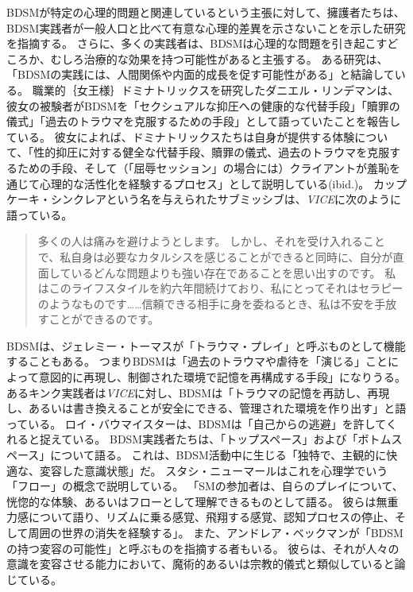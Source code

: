 \documentclass[paper=a4,book,openany]{jlreq}
\begin{document}
BDSMが特定の心理的問題と関連しているという主張に対して、擁護者たちは、BDSM実践者が一般人口と比べて有意な心理的差異を示さないことを示した研究を指摘する\citep{hebert14:_examin_person_charac_assoc_bdsm_orien,powls12:_descr_review_resear_relat_sadom}。
さらに、多くの実践者は、BDSMは心理的な問題を引き起こすどころか、むしろ治療的な効果を持つ可能性があると主張する。
ある研究は、「BDSMの実践には、人間関係や内面的成長を促す可能性がある」と結論している\citep[pp.157-158]{weille02:_psych_consen_sadom_domin_submis_sexual_games}。
職業的｛女王様｝{ドミナトリックス}を研究したダニエル・リンデマンは、彼女の被験者がBDSMを「セクシュアルな抑圧への健康的な代替手段」「贖罪の儀式」「過去のトラウマを克服するための手段」として語っていたことを報告している\citep[p.157]{lindemann11:_bdsm_therap}。
彼女によれば、ドミナトリックスたちは自身が提供する体験について、「性的抑圧に対する健全な代替手段、贖罪の儀式、過去のトラウマを克服するための手段、そして（「屈辱セッション」の場合には）クライアントが羞恥を通じて心理的な活性化を経験するプロセス」として説明している(ibid.)。
カップケーキ・シンクレアという名を与えられたサブミッシブは、\emph{VICE}に次のように語っている。

\begin{quote}
多くの人は痛みを避けようとします。
しかし、それを受け入れることで、私自身は必要なカタルシスを感じることができると同時に、自分が直面しているどんな問題よりも強い存在であることを思い出すのです。
私はこのライフスタイルを約六年間続けており、私にとってそれはセラピーのようなものです……信頼できる相手に身を委ねるとき、私は不安を手放すことができるのです。
\citep{barrett-ibarria17:_bsdm_can_provid_profoun_healin_exper}
\end{quote}

BDSMは、ジェレミー・トーマスが「トラウマ・プレイ」と呼ぶものとして機能することもある。
つまりBDSMは「過去のトラウマや虐待を「演じる」ことによって意図的に再現し、制御された環境で記憶を再構成する手段」になりうる\citep{thomas20:_bdsm_traum_play}。
あるキンク実践者は\emph{VICE}に対し、BDSMは「トラウマの記憶を再訪し、再現し、あるいは書き換えることが安全にできる、管理された環境を作り出す」と語っている\citep{barrett-ibarria17:_bsdm_can_provid_profoun_healin_exper}。
ロイ・バウマイスターは、BDSMは「自己からの逃避」を許してくれると捉えている\citep[p.29]{baumeister88:_masoc_escap_self}。
BDSM実践者たちは、「トップスペース」および「ボトムスペース」について語る。
これは、BDSM活動中に生じる「独特で、主観的に快適な、変容した意識状態」だ\citep[p.77]{ambler17:_consen_bdsm_facil_role_specif}。
スタシ・ニューマールはこれを心理学でいう「フロー」の概念で説明している。
「SMの参加者は、自らのプレイについて、恍惚的な体験、あるいはフローとして理解できるものとして語る。
彼らは無重力感について語り、リズムに乗る感覚、飛翔する感覚、認知プロセスの停止、そして周囲の世界の消失を経験する」\citep[p.328]{newmahr10:_rethin_kink}。
また、アンドレア・ベックマンが「BDSMの持つ変容の可能性」と呼ぶものを指摘する者もいる\citep{beckman01:_decon_myths}。
彼らは、それが人々の意識を変容させる能力において、魔術的あるいは宗教的儀式と類似していると論じている\citep{comfort78:_sexual_idios,norman04:_i_am_leath_shaman}。
\end{document}
